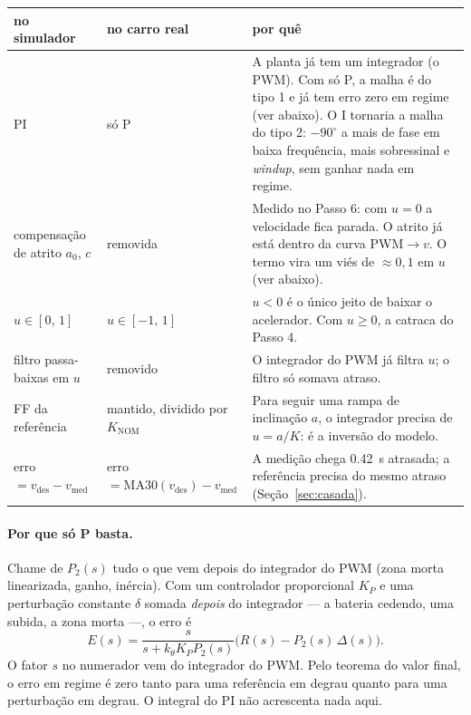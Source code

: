 \documentclass[11pt,a4paper,oneside,openany]{book}
\newcommand{\vmed}{v_{\text{med}}}
\newcommand{\Knom}{K_{\text{NOM}}}
\begin{document}
\begin{center}\small
\begin{tabularx}{\textwidth}{>{\raggedright\arraybackslash}p{3.2cm}>{\raggedright\arraybackslash}p{2.8cm}X}
\toprule
no simulador & no carro real & por quê\\
\midrule
PI & só P &
A planta já tem um integrador (o PWM). Com só P, a malha é do tipo 1 e já tem erro zero em
regime (ver abaixo). O I tornaria a malha do tipo 2: $-90^\circ$ a mais de fase em baixa
frequência, mais sobressinal e \emph{windup}, sem ganhar nada em regime.\\
\addlinespace
compensação de atrito $a_0$, $c$ & removida &
Medido no Passo 6: com $u = 0$ a velocidade fica parada. O atrito já está dentro da curva
PWM$\to v$. O termo vira um viés de $\approx 0{,}1$ em $u$ (ver abaixo).\\
\addlinespace
$u \in [0,\,1]$ & $u \in [-1,\,1]$ &
$u < 0$ é o único jeito de baixar o acelerador. Com $u \ge 0$, a catraca do Passo 4.\\
\addlinespace
filtro passa-baixas em $u$ & removido &
O integrador do PWM já filtra $u$; o filtro só somava atraso.\\
\addlinespace
FF da referência & mantido, dividido por $\Knom$ &
Para seguir uma rampa de inclinação $a$, o integrador precisa de $u = a/K$: é a inversão
do modelo.\\
\addlinespace
erro $= v_{\text{des}} - \vmed$ & erro $= \mathrm{MA30}(v_{\text{des}}) - \vmed$ &
A medição chega \SI{0,42}{s} atrasada; a referência precisa do mesmo atraso
(Seção~\ref{sec:casada}).\\
\bottomrule
\end{tabularx}
\end{center}

\paragraph{Por que só P basta.} Chame de $P_2(s)$ tudo o que vem depois do integrador do
PWM (zona morta linearizada, ganho, inércia). Com um controlador proporcional $K_P$ e uma
perturbação constante $\delta$ somada \emph{depois} do integrador --- a bateria cedendo, uma
subida, a zona morta ---, o erro é
\begin{equation}
  E(s) = \frac{s}{s + k_\theta K_P P_2(s)}\big(R(s) - P_2(s)\,\Delta(s)\big).
\end{equation}
O fator $s$ no numerador vem do integrador do PWM. Pelo teorema do valor final, o erro
em regime é zero tanto para uma referência em degrau quanto para uma perturbação em
degrau. O integral do PI não acrescenta nada aqui.
\end{document}

